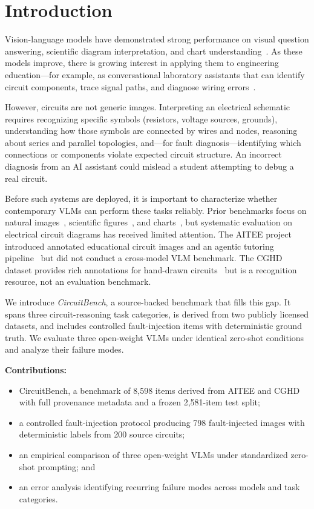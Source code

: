 \documentclass[conference]{IEEEtran}
\begin{document}
\section{Introduction}
\label{sec:intro}

Vision-language models have demonstrated strong performance on visual
question answering, scientific diagram interpretation, and chart
understanding~\cite{liu2023mmbench,lu2022scienceqa,masry2022chartqa}.
As these models improve, there is growing interest in applying them to
engineering education---for example, as conversational laboratory
assistants that can identify circuit components, trace signal paths, and
diagnose wiring errors~\cite{knievel2025aitee_paper}.

However, circuits are not generic images.
Interpreting an electrical schematic requires recognizing specific symbols
(resistors, voltage sources, grounds), understanding how those symbols are
connected by wires and nodes, reasoning about series and parallel
topologies, and---for fault diagnosis---identifying which connections or
components violate expected circuit structure.
An incorrect diagnosis from an AI assistant could mislead a student
attempting to debug a real circuit.

Before such systems are deployed, it is important to characterize
whether contemporary VLMs can perform these tasks reliably.
Prior benchmarks focus on natural images~\cite{liu2023mmbench}, scientific
figures~\cite{lu2022scienceqa}, and charts~\cite{masry2022chartqa}, but
systematic evaluation on electrical circuit diagrams has received limited
attention.
The AITEE project introduced annotated educational circuit images and an
agentic tutoring pipeline~\cite{knievel2025aitee_paper,knievel2025aitee_dataset}
but did not conduct a cross-model VLM benchmark.
The CGHD dataset provides rich annotations for hand-drawn
circuits~\cite{thoma2021cghd_paper,thoma2025cghd} but is a recognition
resource, not an evaluation benchmark.

We introduce \emph{CircuitBench}, a source-backed benchmark that fills
this gap.
It spans three circuit-reasoning task categories, is derived from
two publicly licensed datasets, and includes controlled fault-injection
items with deterministic ground truth.
We evaluate three open-weight VLMs under identical zero-shot conditions
and analyze their failure modes.

\textbf{Contributions:}
\begin{itemize}
  \item CircuitBench, a benchmark of 8,598 items derived from AITEE and
        CGHD with full provenance metadata and a frozen 2,581-item test split;
  \item a controlled fault-injection protocol producing 798 fault-injected
        images with deterministic labels from 200 source circuits;
  \item an empirical comparison of three open-weight VLMs under
        standardized zero-shot prompting; and
  \item an error analysis identifying recurring failure modes across models
        and task categories.
\end{itemize}
\end{document}
